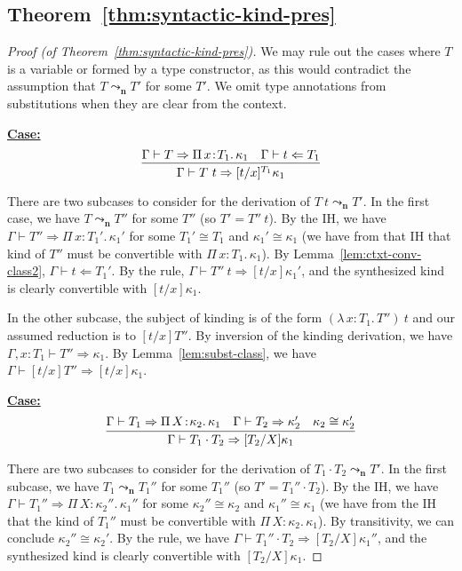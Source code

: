 \documentclass{article}
\newcommand{\abs}[4]{{#1}\, #2\! : \! #3.\, #4}
\newcommand{\leadstoc}[0]{\ensuremath{\leadsto_{\mathbf{n}}}}
\newcommand{\tpcheck}[0]{\Leftarrow}
\newcommand{\tpsynth}[0]{\Rightarrow}
\newcommand{\startcase}[1]{\vspace{#1} \noindent\textbf{\underline{Case:}}}
\begin{document}
\subsection{Theorem~\ref{thm:syntactic-kind-pres}}
\begin{proof}[Proof (of Theorem~\ref{thm:syntactic-kind-pres})]
  We may rule out the cases where \(T\) is a variable or formed by a type
  constructor, as this would contradict the assumption that \(T \leadstoc
  T'\) for some \(T'\).
  We omit type annotations from substitutions when they are clear from the context.

  \startcase{.2cm}
  \[
    \infer{\Gamma\vdash T\ t \tpsynth [t/x]^{T_1}\kappa_1}{\Gamma\vdash T \tpsynth
      \abs{\Pi}{x}{T_1}{\kappa_1} & \Gamma\vdash t \tpcheck T_1}
  \]

  There are two subcases to consider for the derivation of \(T\ t \leadstoc
  T'\). In the first case, we have \(T \leadstoc T''\) for some \(T''\) (so
  \(T' = T''\ t\)). By the IH, we have \(\Gamma \vdash T'' \tpsynth
  \abs{\Pi}{x}{T_1'}{\kappa_1'}\) for some \(T_1' \cong T_1\) and \(\kappa_1'
  \cong \kappa_1\) (we have from that IH that kind of \(T''\) must be
  convertible with \(\abs{\Pi}{x}{T_1}{\kappa_1}\)). By
  Lemma~\ref{lem:ctxt-conv-class2}, \(\Gamma \vdash t \tpcheck T_1'\).
  By the rule, \(\Gamma \vdash T''\ t \tpsynth [t/x]\kappa_1'\), and the
  synthesized kind is clearly convertible with \([t/x]\kappa_1\).

  In the other subcase, the subject of kinding is of the form
  \((\abs{\lambda}{x}{T_1}{T''})\ t\) and our assumed reduction is to
  \([t/x]T''\). By inversion of the kinding derivation, we have \(\Gamma,x:T_1
  \vdash T'' \tpsynth \kappa_1\). By Lemma~\ref{lem:subst-class}, we have
  \(\Gamma \vdash [t/x]T'' \tpsynth [t/x]\kappa_1\).

  \startcase{.2cm}
  \[
    \infer{\Gamma\vdash T_1 \cdot T_2 \tpsynth [T_2/X]\kappa_1}{\Gamma\vdash T_1
      \tpsynth \abs{\Pi}{X}{\kappa_2}{\kappa_1} & \Gamma\vdash T_2 \tpsynth
      \kappa_2' & \kappa_2 \cong \kappa_2'}
  \]

  There are two subcases to consider for the derivation of \(T_1 \cdot T_2
  \leadstoc T'\). In the first subcase, we have \(T_1 \leadstoc
  T_1''\) for some \(T_1''\) (so \(T' = T_1'' \cdot T_2\)). By the IH, we have
  \(\Gamma \vdash T_1'' \tpsynth \abs{\Pi}{X}{\kappa_2''}{\kappa_1''}\) for some
  \(\kappa_2'' \cong \kappa_2\) and \(\kappa_1'' \cong \kappa_1\) (we have from
  the IH that the kind of \(T_1''\) must be convertible with
  \(\abs{\Pi}{X}{\kappa_2}{\kappa_1}\)).
  By transitivity, we can conclude \(\kappa_2'' \cong \kappa_2'\).
  By the rule, we have \(\Gamma \vdash T_1'' \cdot T_2 \tpsynth
  [T_2/X]\kappa_1''\), and the synthesized kind is clearly convertible with
  \([T_2/X]\kappa_1\).


\end{proof}
\end{document}
